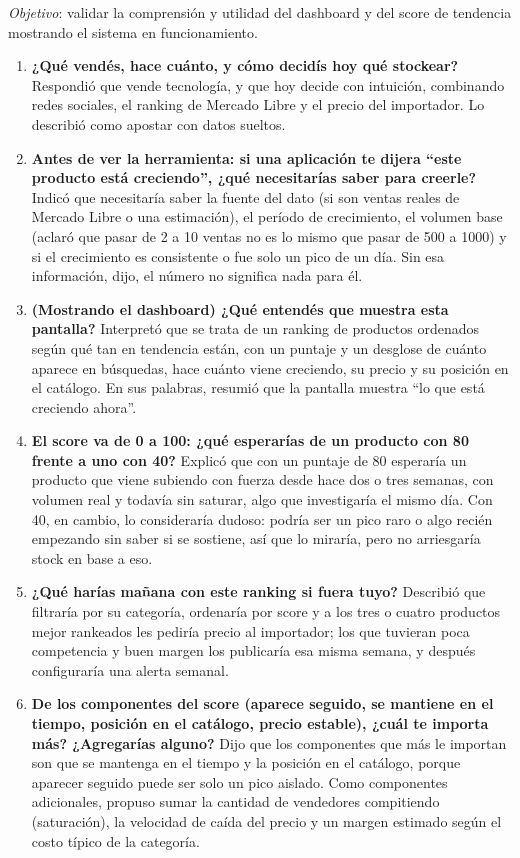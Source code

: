 \emph{Objetivo}: validar la comprensión y utilidad del dashboard y del score de tendencia mostrando el sistema en funcionamiento.

\begin{enumerate}
	\item \textbf{¿Qué vendés, hace cuánto, y cómo decidís hoy qué stockear?} Respondió que vende tecnología, y que hoy decide con intuición, combinando redes sociales, el ranking de Mercado Libre y el precio del importador. Lo describió como apostar con datos sueltos.
	\item \textbf{Antes de ver la herramienta: si una aplicación te dijera ``este producto está creciendo'', ¿qué necesitarías saber para creerle?} Indicó que necesitaría saber la fuente del dato (si son ventas reales de Mercado Libre o una estimación), el período de crecimiento, el volumen base (aclaró que pasar de 2 a 10 ventas no es lo mismo que pasar de 500 a 1000) y si el crecimiento es consistente o fue solo un pico de un día. Sin esa información, dijo, el número no significa nada para él.
	\item \textbf{(Mostrando el dashboard) ¿Qué entendés que muestra esta pantalla?} Interpretó que se trata de un ranking de productos ordenados según qué tan en tendencia están, con un puntaje y un desglose de cuánto aparece en búsquedas, hace cuánto viene creciendo, su precio y su posición en el catálogo. En sus palabras, resumió que la pantalla muestra ``lo que está creciendo ahora''.
	\item \textbf{El score va de 0 a 100: ¿qué esperarías de un producto con 80 frente a uno con 40?} Explicó que con un puntaje de 80 esperaría un producto que viene subiendo con fuerza desde hace dos o tres semanas, con volumen real y todavía sin saturar, algo que investigaría el mismo día. Con 40, en cambio, lo consideraría dudoso: podría ser un pico raro o algo recién empezando sin saber si se sostiene, así que lo miraría, pero no arriesgaría stock en base a eso.
	\item \textbf{¿Qué harías mañana con este ranking si fuera tuyo?} Describió que filtraría por su categoría, ordenaría por score y a los tres o cuatro productos mejor rankeados les pediría precio al importador; los que tuvieran poca competencia y buen margen los publicaría esa misma semana, y después configuraría una alerta semanal.
	\item \textbf{De los componentes del score (aparece seguido, se mantiene en el tiempo, posición en el catálogo, precio estable), ¿cuál te importa más? ¿Agregarías alguno?} Dijo que los componentes que más le importan son que se mantenga en el tiempo y la posición en el catálogo, porque aparecer seguido puede ser solo un pico aislado. Como componentes adicionales, propuso sumar la cantidad de vendedores compitiendo (saturación), la velocidad de caída del precio y un margen estimado según el costo típico de la categoría.

\end{enumerate}
